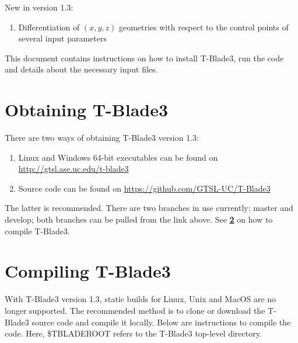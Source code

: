 \documentclass[8pt]{article}
\begin{document}
\noindent
New in version 1.3:

\begin{enumerate}[leftmargin=*]
	\item Differentiation of $(x,y,z)$ geometries with respect to the control points of several input parameters
\end{enumerate}

\noindent
This document contains instructions on how to install T-Blade3, run the code and details about the necessary input files.

\section{Obtaining T-Blade3}
\noindent 
There are two ways of obtaining T-Blade3 version 1.3:
 
\begin{enumerate}[leftmargin=*]
    \item Linux and Windows 64-bit executables can be found on \url{http://gtsl.ase.uc.edu/t-blade3}
    \item Source code can be found on \url{https://github.com/GTSL-UC/T-Blade3}
\end{enumerate}

\noindent
The latter is recommended. There are two branches in use currently: {\selectfont master} and {\selectfont develop}; both branches can be pulled from the link above. See \textbf{\ref{compilesec}} on how to compile T-Blade3.

\section{Compiling T-Blade3}\label{compilesec}
\noindent
With T-Blade3 version 1.3, static builds for Linux, Unix and MacOS are no longer supported. The recommended method is to clone or download the T-Blade3 source code and compile it locally. Below are instructions to compile the code. Here, \$TBLADEROOT refers to the T-Blade3 top-level directory.
\end{document}
